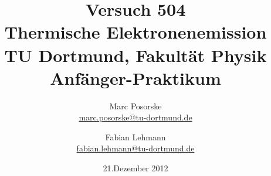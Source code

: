 

\renewcommand*\rmdefault{iwona}\normalfont\upshape


\title{Versuch 504\\Thermische Elektronenemission\\				%
\large TU Dortmund, Fakultät Physik\\ 
\normalsize Anfänger-Praktikum}

\author{Marc Posorske\\			%
{\small \href{marc.posorske@tu-dortmund.de}{marc.posorske@tu-dortmund.de}}	%
\and						%
Fabian Lehmann\\					%
{\small \href{fabian.lehmann@tu-dortmund.de}{fabian.lehmann@tu-dortmund.de}}		%
}
\date{21.Dezember 2012}				%





\maketitle					%
\thispagestyle{empty} 				%


\newpage					%

\tableofcontents

\newpage					%

\newpage					%



